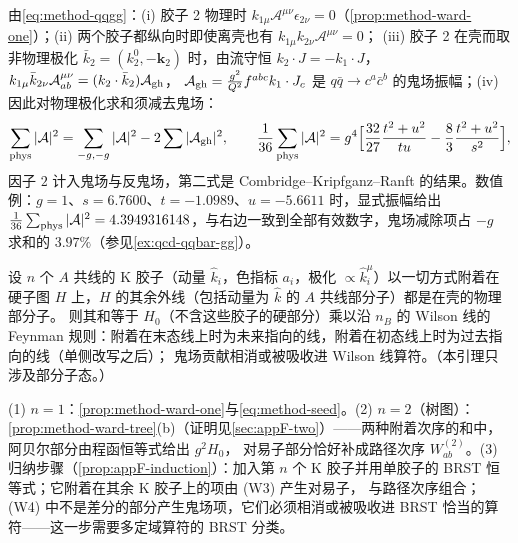 \begin{example}\label{ex:method-ward-tree}
由\cref{eq:method-qqgg}：(i) 胶子 2 物理时 $k_{1\mu}\mathcal A^{\mu\nu}\epsilon_{2\nu}=0$（\cref{prop:method-ward-one}）；(ii) 两个胶子都纵向时即使离壳也有 $k_{1\mu}k_{2\nu}\mathcal A^{\mu\nu}=0$；
(iii) 胶子 2 在壳而取非物理极化 $\bar k_2=(k_2^0,-\mathbf k_2)$ 时，由流守恒 $k_2\cdot J=-k_1\cdot J$，$k_{1\mu}\bar k_{2\nu}\mathcal A^{\mu\nu}_{ab}=(k_2\cdot\bar k_2)\mathcal A_{\rm gh}$，
$\mathcal A_{\rm gh}=\frac{g^2}{Q^2}f^{abc}k_1\cdot J_c$ 是 $q\bar q\to c^a\bar c^b$ 的鬼场振幅；(iv) 因此对物理极化求和须减去鬼场：
\begin{equation}\label{eq:method-ghostsum}
\sum_{\rm phys}|\mathcal A|^2=\sum_{-g,-g}|\mathcal A|^2-2\sum|\mathcal A_{\rm gh}|^2 ,\qquad
\frac1{36}\sum_{\rm phys}|\mathcal A|^2=g^4\Bigl[\frac{32}{27}\frac{t^2+u^2}{tu}-\frac83\frac{t^2+u^2}{s^2}\Bigr],
\end{equation}
因子 $2$ 计入鬼场与反鬼场，第二式是 Combridge--Kripfganz--Ranft 的结果\cite{CombridgeKripfganzRanft1977}。数值例：$g=1$、$s=6.7600$、$t=-1.0989$、$u=-5.6611$ 时，显式振幅给出
$\frac1{36}\sum_{\rm phys}|\mathcal A|^2=4.3949316148$，与右边一致到全部有效数字，鬼场减除项占 $-g$ 求和的 $3.97\%$（参见\cref{ex:qcd-qqbar-gg}）。
\end{example}

\begin{lemma}\label{lem:method-ward-multi}
设 $n$ 个 $A$ 共线的 K 胶子（动量 $\hat k_i$，色指标 $a_i$，极化 $\propto\hat k_i^\mu$）以一切方式附着在硬子图 $H$ 上，$H$ 的其余外线（包括动量为 $\hat k$ 的 $A$ 共线部分子）都是在壳的物理部分子。
则其和等于 $H_0$（不含这些胶子的硬部分）乘以沿 $n_B$ 的 Wilson 线的 Feynman 规则：附着在末态线上时为未来指向的线，附着在初态线上时为过去指向的线（单侧改写之后）；
鬼场贡献相消或被吸收进 Wilson 线算符。（本引理只涉及部分子态。）
\end{lemma}

\begin{proofsketch}
(1) $n=1$：\cref{prop:method-ward-one}与\cref{eq:method-seed}。(2) $n=2$（树图）：\cref{prop:method-ward-tree}(b)（证明见\cref{sec:appF-two}）——两种附着次序的和中，阿贝尔部分由程函恒等式给出 $g^2H_0$，
对易子部分恰好补成路径次序 $W^{(2)}_{ab}$。(3) 归纳步骤（\cref{prop:appF-induction}）：加入第 $n$ 个 K 胶子并用单胶子的 BRST 恒等式；它附着在其余 K 胶子上的项由 (W3) 产生对易子，
与路径次序组合；(W4) 中不是差分的部分产生鬼场项，它们必须相消或被吸收进 BRST 恰当的算符——这一步需要多定域算符的 BRST 分类。
\end{proofsketch}

